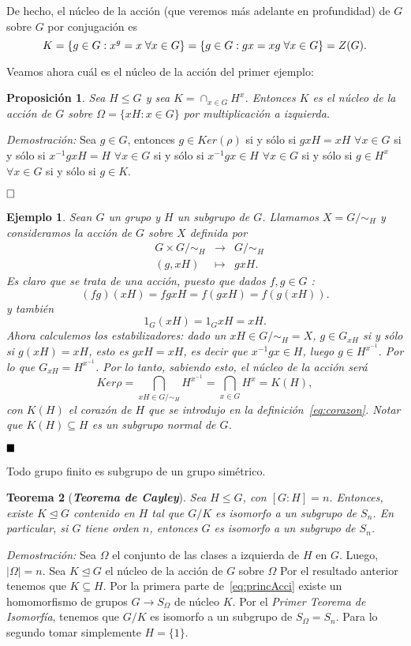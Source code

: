 \documentclass[12pt]{article}
\newtheorem{theorem}{Teorema}[section]
\newtheorem{proposition}[theorem]{Proposición}
\newtheorem{example}{Ejemplo}[theorem]
\begin{document}
De hecho, el núcleo de la acción (que veremos más adelante en profundidad) de $G$ sobre $G$ por conjugación es $$K = \lbrace g \in G : x^g =x \hspace{0.1cm} \forall x \in G \rbrace = \lbrace g \in G:gx=xg \hspace{0.1cm} \forall x \in G \rbrace = Z(G).$$

Veamos ahora cuál es el núcleo de la acción del primer ejemplo:

\begin{proposition}Sea $H \leq G$ y sea $K = \cap_{x \in G} H^x$. Entonces $K$ es el núcleo de la acción de $G$ sobre $\Omega = \lbrace xH :x \in G \rbrace$ por multiplicación a izquierda.
\end{proposition}
\emph{Demostración: }Sea $g \in G$, entonces $g \in Ker (\rho)$ si y sólo si $gxH = xH$ $\forall x \in G$ si y sólo si $x^{-1}gx H = H$  $\forall x \in G$ si y sólo si $x^{-1}gx \in H$ $\forall x \in G$ si y sólo si $g \in H^x$ $\forall x \in G$ si y sólo si $g \in K$.

$\hfill \square$

\begin{example}\label{eq:ejcorazon} Sean $G$ un grupo y $H$ un subgrupo de $G$. Llamamos $X = G/\sim_{H}$ y consideramos la acción de $G$ sobre $X$ definida por $$\begin{array}{rccl}
&G\times G/\sim_{H}& \longrightarrow &G/\sim_{H}\\
&(g,xH)& \longmapsto &gxH.
\end{array}
$$ Es claro que se trata de una acción, puesto que dados $f,g \in G$ : $$(fg)(xH)= fgxH = f(gxH) = f(g(xH)).$$ y también $$1_{G}(xH) = 1_{G}xH = xH.$$ Ahora calculemos los estabilizadores: dado un $xH \in G/\sim_{H} = X$, $g \in G_{xH}$ si y sólo si $g(xH) = xH$, esto es $gxH = xH$, es decir que $x^{-1}gx \in H$, luego $g \in H^{x^{-1}}$. Por lo que $G_{xH} = H^{x^{-1}}$. Por lo tanto, sabiendo esto, el núcleo de la acción será $$Ker\rho = \bigcap_{xH \in G/\sim_{H}} H^{x^{-1}} = \bigcap_{x\in G}H^{x} = K(H),$$ con $K(H)$ el \textit{corazón de $H$} que se introdujo en la definición~\ref{eq:corazon}. Notar que $K(H) \subseteq H$ es un subgrupo normal de $G$.
\end{example}
$\hfill \blacksquare$

Todo grupo finito es subgrupo de un grupo simétrico.

\begin{theorem}[\textbf{\textit{Teorema de Cayley}}]
Sea $H \leq G$, con $[G:H] = n$. Entonces, existe $K \unlhd G$ contenido en $H$ tal que $G/K$ es isomorfo a un subgrupo de $S_n$. En particular, si $G$ tiene orden $n$, entonces $G$ es isomorfo a un subgrupo de $S_n$.
\end{theorem}
\emph{Demostración: }Sea $\Omega$ el conjunto de las clases a izquierda de $H$ en $G$. Luego, $|\Omega | = n$. Sea $K \unlhd G$ el núcleo de la acción de $G$ sobre $\Omega$ Por el resultado anterior tenemos que $K \subseteq H$. Por la primera parte de~\ref{eq:princAcci} existe un homomorfismo de grupos $G \longrightarrow S_{\Omega}$ de núcleo $K$. Por el \textit{Primer Teorema de Isomorfía}, tenemos que $G/K$ es isomorfo a un subgrupo de $S_{\Omega} = S_n$. Para lo segundo tomar simplemente $H = \lbrace 1 \rbrace$.
\end{document}

